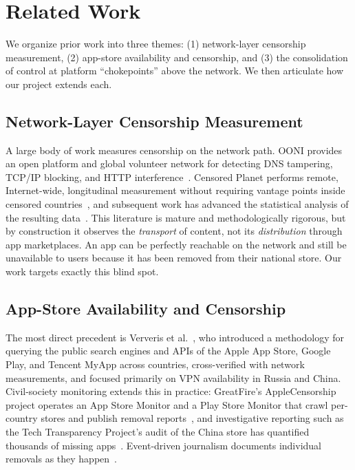 \section{Related Work}\label{sec:related}

We organize prior work into three themes: (1) network-layer censorship
measurement, (2) app-store availability and censorship, and (3) the consolidation
of control at platform ``chokepoints'' above the network. We then articulate how
our project extends each.

\subsection{Network-Layer Censorship Measurement}

A large body of work measures censorship on the network path. OONI provides an
open platform and global volunteer network for detecting DNS tampering, TCP/IP
blocking, and HTTP interference~\cite{filasto2012ooni}. Censored Planet performs
remote, Internet-wide, longitudinal measurement without requiring vantage points
inside censored countries~\cite{sundararaman2020censoredplanet}, and subsequent
work has advanced the statistical analysis of the resulting
data~\cite{sundararaman2023analysis}. This literature is mature and
methodologically rigorous, but by construction it observes the \emph{transport}
of content, not its \emph{distribution} through app marketplaces. An app can be
perfectly reachable on the network and still be unavailable to users because it
has been removed from their national store. Our work targets exactly this blind
spot.

\subsection{App-Store Availability and Censorship}

The most direct precedent is Ververis et al.~\cite{ververis2019shedding}, who
introduced a methodology for querying the public search engines and APIs of the
Apple App Store, Google Play, and Tencent MyApp across countries, cross-verified
with network measurements, and focused primarily on VPN availability in Russia
and China. Civil-society monitoring extends this in practice: GreatFire's
AppleCensorship project operates an App Store Monitor and a Play Store Monitor
that crawl per-country stores and publish removal reports~\cite{applecensorship},
and investigative reporting such as the Tech Transparency Project's audit of the
China store has quantified thousands of missing apps~\cite{ttp2021china}.
Event-driven journalism documents individual removals as they
happen~\cite{techcrunch2024russia,moscowtimes2024russia,cnbc2017china,techcrunch2020india}.

